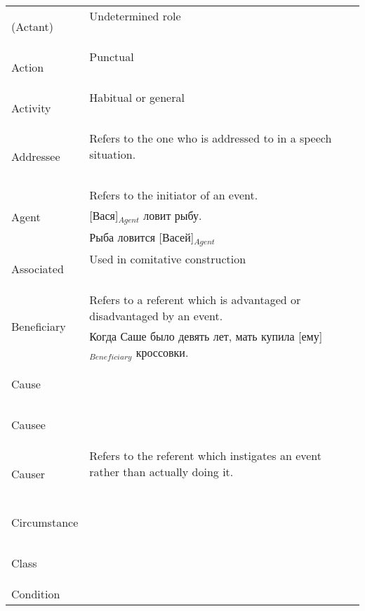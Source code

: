 \documentclass[a4paper,11pt, onecolumn,twoside]{article}
\begin{document}
\begin{longtable}{ p{}  p{} } 
\toprule
 \multirow{2}{*}{(Actant)} & Undetermined role \\ 
        & ~ \\
\midrule
 \multirow{2}{*}{Action} & Punctual  \\ 
        & ~ \\
\midrule
 \multirow{2}{*}{Activity} & Habitual or general \\ 
        & ~ \\
\midrule
 \multirow{2}{*}{Addressee} & Refers to the one who is addressed to in a speech situation. \\ 
        & ~ \\
\midrule
 \multirow{3}{*}{Agent} & Refers to the initiator of an event. \\ 
        & [Вася]$_{Agent}$ ловит рыбу. \\
        & Рыба ловится [Васей]$_{Agent}$ \\
\midrule
 \multirow{2}{*}{Associated} & Used in comitative construction \\ 
        & ~ \\
\midrule
 \multirow{2}{*}{Beneficiary} & Refers to a referent which is advantaged or disadvantaged by an event. \\ 
        & Когда Саше было девять лет, мать купила [ему]$_{Beneficiary}$ кроссовки. \\
\midrule
 \multirow{2}{*}{Cause} & ~ \\ 
        & ~ \\
\midrule
 \multirow{2}{*}{Causee} & ~ \\ 
        & ~ \\
\midrule
 \multirow{2}{*}{Causer} & Refers to the referent which instigates an event rather than actually doing it. \\ 
        & ~ \\
\midrule
 \multirow{2}{*}{Circumstance} & ~ \\ 
        & ~ \\
\midrule
 \multirow{2}{*}{Class} & ~ \\ 
        & ~ \\
\midrule
 \multirow{2}{*}{Condition} & ~ \\ 

\end{longtable}
\end{document}
